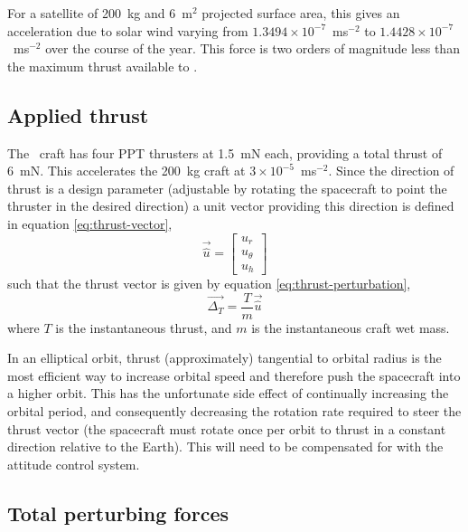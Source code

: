 For a satellite of 200~kg and 6~m$^2$ projected surface area, this gives an acceleration due to solar wind varying from $1.3494\times10^{-7}$~ms$^{-2}$ to $1.4428\times10^{-7}$~ms$^{-2}$ over the course of the year. This force is two orders of magnitude less than the maximum thrust available to \BW.

 
 

\subsection{Applied thrust} \label{sub:Applied-Thrust}

The \BW\ craft has four PPT thrusters at 1.5~mN each, providing a total thrust of 6~mN. This accelerates the 200~kg craft at $3\times10^{-5}$~ms$^{-2}$. Since the direction of thrust is a design parameter (adjustable by rotating the spacecraft to point the thruster in the desired direction) a unit vector providing this direction is defined in equation \eqref{eq:thrust-vector},
\begin{equation} \label{eq:thrust-vector}
\vec{\hat{u}}=\left[\begin{array}{c}
u_{r}\\
u_{\theta}\\
u_{h}
\end{array}\right]
\end{equation}
such that the thrust vector is given by equation \eqref{eq:thrust-perturbation},
\begin{equation}
\vec{\Delta_{T}}=\frac{T}{m}\vec{\hat{u}} \label{eq:thrust-perturbation}
\end{equation}
where $T$ is the instantaneous thrust, and $m$ is the instantaneous craft wet mass.

In an elliptical orbit, thrust (approximately) tangential to orbital radius is the most efficient way to increase orbital speed and therefore push the spacecraft into a higher orbit. This has the unfortunate side effect of continually increasing the orbital period, and consequently decreasing the rotation rate required to steer the thrust vector (the spacecraft must rotate once per orbit to thrust in a constant direction relative to the Earth). This will need to be compensated for with the attitude control system.

\subsection{Total perturbing forces}

